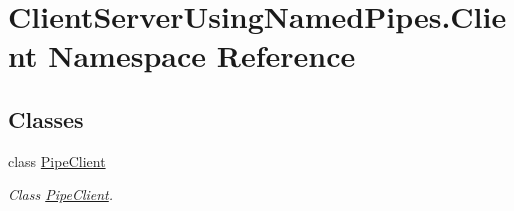 \hypertarget{namespace_client_server_using_named_pipes_1_1_client}{}\section{Client\+Server\+Using\+Named\+Pipes.\+Client Namespace Reference}
\label{namespace_client_server_using_named_pipes_1_1_client}
\subsection*{Classes}
\begin{DoxyCompactItemize}
\item 
class \hyperlink{class_client_server_using_named_pipes_1_1_client_1_1_pipe_client}{Pipe\+Client}
\begin{DoxyCompactList}\small\item\em Class \hyperlink{class_client_server_using_named_pipes_1_1_client_1_1_pipe_client}{Pipe\+Client}. \end{DoxyCompactList}\end{DoxyCompactItemize}
